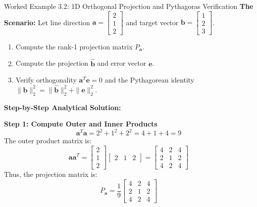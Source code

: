 \begin{examplebox}{Worked Example 3.2: 1D Orthogonal Projection and Pythagoras Verification}
\label{ex:w03_1d_projection}
\textbf{The Scenario:}
Let line direction $\mathbf{a} = \begin{bmatrix} 2 \\ 1 \\ 2 \end{bmatrix}$ and target vector $\mathbf{b} = \begin{bmatrix} 1 \\ 2 \\ 3 \end{bmatrix}$. 
\begin{enumerate}
    \item Compute the rank-1 projection matrix $P_{\mathbf{a}}$.
    \item Compute the projection $\hat{\mathbf{b}}$ and error vector $\mathbf{e}$.
    \item Verify orthogonality $\mathbf{a}^T \mathbf{e} = 0$ and the Pythagorean identity $\|\mathbf{b}\|_2^2 = \|\hat{\mathbf{b}}\|_2^2 + \|\mathbf{e}\|_2^2$.
\end{enumerate}

\tcblower
\textbf{Step-by-Step Analytical Solution:}

\textbf{Step 1: Compute Outer and Inner Products}
\begin{equation*}
\mathbf{a}^T \mathbf{a} = 2^2 + 1^2 + 2^2 = 4 + 1 + 4 = 9
\end{equation*}
The outer product matrix is:
\begin{equation*}
\mathbf{a}\mathbf{a}^T = \begin{bmatrix} 2 \\ 1 \\ 2 \end{bmatrix} \begin{bmatrix} 2 & 1 & 2 \end{bmatrix} = \begin{bmatrix} 4 & 2 & 4 \\ 2 & 1 & 2 \\ 4 & 2 & 4 \end{bmatrix}
\end{equation*}
Thus, the projection matrix is:
\begin{equation*}
P_{\mathbf{a}} = \frac{1}{9} \begin{bmatrix} 4 & 2 & 4 \\ 2 & 1 & 2 \\ 4 & 2 & 4 \end{bmatrix}
\end{equation*}


\end{examplebox}
